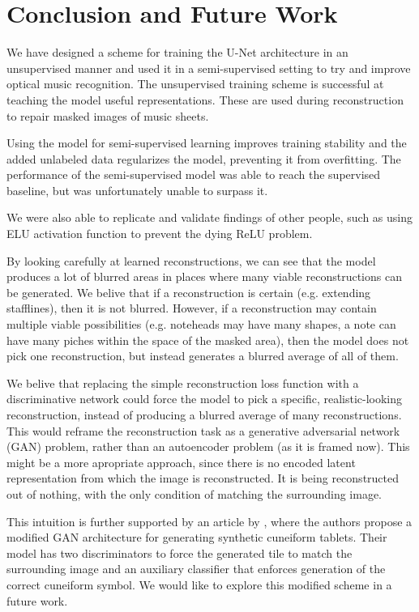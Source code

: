 \chapter{Conclusion and Future Work}
\label{chap:ConclusionAndFutureWork}

We have designed a scheme for training the U-Net architecture in an unsupervised manner and used it in a semi-supervised setting to try and improve optical music recognition. The unsupervised training scheme is successful at teaching the model useful representations. These are used during reconstruction to repair masked images of music sheets.

Using the model for semi-supervised learning improves training stability and the added unlabeled data regularizes the model, preventing it from overfitting. The performance of the semi-supervised model was able to reach the supervised baseline, but was unfortunately unable to surpass it.

We were also able to replicate and validate findings of other people, such as using ELU activation function to prevent the dying ReLU problem.

By looking carefully at learned reconstructions, we can see that the model produces a lot of blurred areas in places where many viable reconstructions can be generated. We belive that if a reconstruction is certain (e.g. extending stafflines), then it is not blurred. However, if a reconstruction may contain multiple viable possibilities (e.g. noteheads may have many shapes, a note can have many piches within the space of the masked area), then the model does not pick one reconstruction, but instead generates a blurred average of all of them.

We belive that replacing the simple reconstruction loss function with a discriminative network could force the model to pick a specific, realistic-looking reconstruction, instead of producing a blurred average of many reconstructions. This would reframe the reconstruction task as a generative adversarial network (GAN) problem, rather than an autoencoder problem (as it is framed now). This might be a more apropriate approach, since there is no encoded latent representation from which the image is reconstructed. It is being reconstructed out of nothing, with the only condition of matching the surrounding image.

This intuition is further supported by an article by \cite{Cuneiforms}, where the authors propose a modified GAN architecture for generating synthetic cuneiform tablets. Their model has two discriminators to force the generated tile to match the surrounding image and an auxiliary classifier that enforces generation of the correct cuneiform symbol. We would like to explore this modified scheme in a future work.


